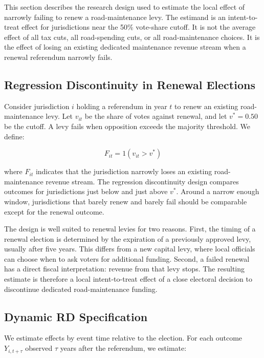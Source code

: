 This section describes the research design used to estimate the local effect of narrowly failing to renew a road-maintenance levy. The estimand is an intent-to-treat effect for jurisdictions near the 50\% vote-share cutoff. It is not the average effect of all tax cuts, all road-spending cuts, or all road-maintenance choices. It is the effect of losing an existing dedicated maintenance revenue stream when a renewal referendum narrowly fails.

\subsection{Regression Discontinuity in Renewal Elections}

Consider jurisdiction $i$ holding a referendum in year $t$ to renew an existing road-maintenance levy. Let $v_{it}$ be the share of votes against renewal, and let $v^* = 0.50$ be the cutoff. A levy fails when opposition exceeds the majority threshold. We define:

\begin{equation}
F_{it} = 1(v_{it} > v^*)
\end{equation}

\noindent where $F_{it}$ indicates that the jurisdiction narrowly loses an existing road-maintenance revenue stream. The regression discontinuity design compares outcomes for jurisdictions just below and just above $v^*$. Around a narrow enough window, jurisdictions that barely renew and barely fail should be comparable except for the renewal outcome.

The design is well suited to renewal levies for two reasons. First, the timing of a renewal election is determined by the expiration of a previously approved levy, usually after five years. This differs from a new capital levy, where local officials can choose when to ask voters for additional funding. Second, a failed renewal has a direct fiscal interpretation: revenue from that levy stops. The resulting estimate is therefore a local intent-to-treat effect of a close electoral decision to discontinue dedicated road-maintenance funding.

\subsection{Dynamic RD Specification}

We estimate effects by event time relative to the election. For each outcome $Y_{i,t+\tau}$ observed $\tau$ years after the referendum, we estimate:


